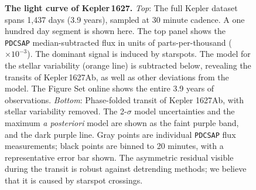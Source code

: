 \documentclass[12pt,modern,twocolumn,tighten]{aastex63}
\newcommand{\pn}{Kepler\,1627Ab} %
\begin{document}
\begin{figure}[tp]
	\begin{center}
		\leavevmode
	
	\end{center}
	\vspace{-0.7cm}
  \caption{ {\bf The light curve of Kepler\,1627.}
    {\it Top}: 
    The full Kepler dataset spans 1{,}437 days (3.9 years), sampled at
    30 minute cadence.  A one hundred day segment is shown here.  The
    top panel shows the \texttt{PDCSAP} median-subtracted flux in
    units of parts-per-thousand ($\times 10^{-3}$).  The dominant
    signal is induced by starspots.  The model for the stellar
    variability (orange line) is subtracted below, revealing the
    transits of \pn, as well as other deviations from the model.  The
    Figure Set online shows the entire 3.9 years of observations.
    {\it Bottom}:
    Phase-folded transit of Kepler 1627Ab, with stellar variability
    removed.  The 2-$\sigma$ model uncertainties and the maximum {\it
    a posteriori} model are shown as the faint purple band, and the
    dark purple line.  Gray points are individual \texttt{PDCSAP} flux
    measurements; black points are binned to 20 minutes, with a
    representative error bar shown.  The asymmetric residual visible
    during the transit is robust against detrending methods; we
    believe that it is caused by starspot crossings.
    \label{fig:lc}
  }
\end{figure}
\end{document}
